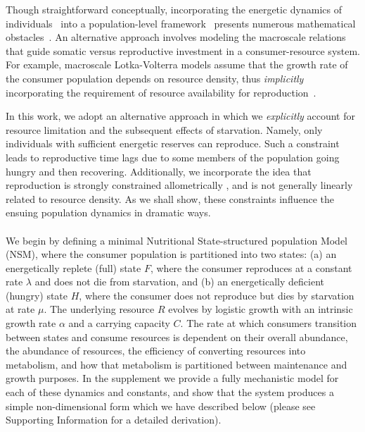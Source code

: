 \documentclass{pnastwo}
\begin{document}
\begin{article}
Though straightforward conceptually, incorporating the energetic dynamics of individuals~\cite{Kooi2000} into a population-level framework~\cite{Kooi2000,Sousa:2010ez} presents numerous mathematical obstacles~\cite{Diekmann:2010da}.
An alternative approach involves modeling the macroscale relations that guide somatic versus reproductive investment in a consumer-resource system.
For example, macroscale Lotka-Volterra models assume that the growth rate of the consumer population depends on resource density, thus \emph{implicitly} incorporating the requirement of resource availability for reproduction~\cite{murdoch:2003}.

In this work, we adopt an alternative approach in which we \emph{explicitly} account for resource limitation and the subsequent effects of starvation.
Namely, only individuals with sufficient energetic reserves can reproduce.
Such a constraint leads to reproductive time lags due to some members of the population going hungry and then recovering.
Additionally, we incorporate the idea that reproduction is strongly constrained allometrically \cite{Kempes:2012hy}, and is not generally linearly related to resource density.
As we shall show, these constraints influence the ensuing population dynamics in dramatic ways.
\\

\\
We begin by defining a minimal Nutritional State-structured population Model (NSM), where the consumer population is partitioned into two states: (a) an energetically replete (full) state $F$, where the consumer reproduces at a constant rate $\lambda$ and does not die from starvation, and (b) an energetically deficient (hungry) state $H$, where the consumer does not reproduce but dies by starvation at rate $\mu$. The underlying resource $R$ evolves by logistic growth with an intrinsic growth rate $\alpha$ and a carrying capacity $C$. The rate at which consumers transition between states and consume resources is dependent on their overall abundance, the abundance of resources, the efficiency of converting resources into metabolism, and how that metabolism is partitioned between maintenance and growth purposes. In the supplement we provide a fully mechanistic model for each of these dynamics and constants, and show that the system produces a simple non-dimensional form which we have described below (please see Supporting Information for a detailed derivation).


\end{article}
\end{document}
